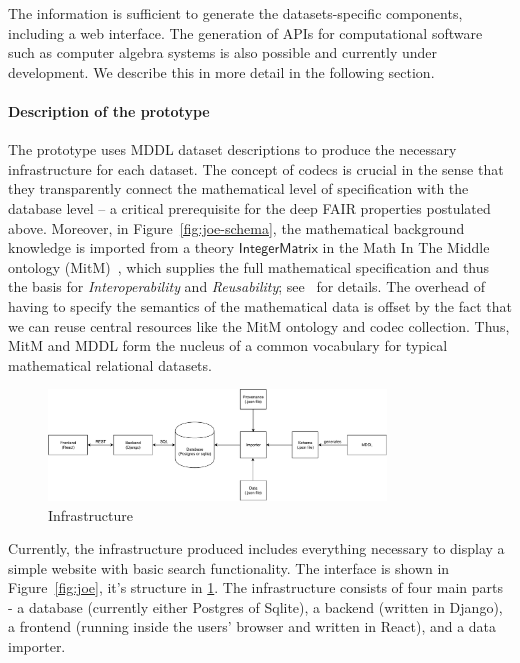 The information is sufficient to generate the datasets-specific components,
including a web interface.
The generation of APIs for computational software such as computer algebra systems 
is also possible and currently under development.
We describe this in more detail in the following section.

\paragraph{Description of the \dmh prototype}
The prototype uses MDDL dataset descriptions to produce the necessary infrastructure for each dataset.
The concept of codecs is crucial in the sense that they transparently connect 
the mathematical level of specification with the database level -- 
a critical prerequisite for the deep FAIR properties postulated above.
Moreover, in Figure~\ref{fig:joe-schema}, the mathematical background knowledge is 
imported from a theory $\mathsf{IntegerMatrix}$ in the Math In The Middle ontology (MitM)~\cite{MitM:on}, 
which supplies the full mathematical specification and thus the basis for \emph{Interoperability} and \emph{Reusability}; see~\cite{BerKohRab:tumdi19,WieKohRab:vtuimkb17,KohMuePfe:kbimss17} for details.
The overhead of having to specify the semantics of the mathematical data is offset by the fact that we can reuse central resources like the MitM ontology and codec collection. 
Thus, MitM and MDDL form the nucleus of a common vocabulary for typical mathematical relational datasets. 

\begin{figure}[ht]
  \includegraphics[width=0.8\textwidth]{DMH_infra.pdf}
  \caption{\dmh Infrastructure}\label{fig:dmhstruct}
\end{figure}

Currently, the infrastructure produced includes everything necessary to display a simple website with basic search functionality. 
The interface is shown in Figure~\ref{fig:joe}, it's structure in \ref{fig:dmhstruct}. 
The infrastructure consists of four main parts - a database (currently either Postgres of Sqlite), a backend (written in Django), a frontend (running inside the users' browser and written in React), and a data importer.

